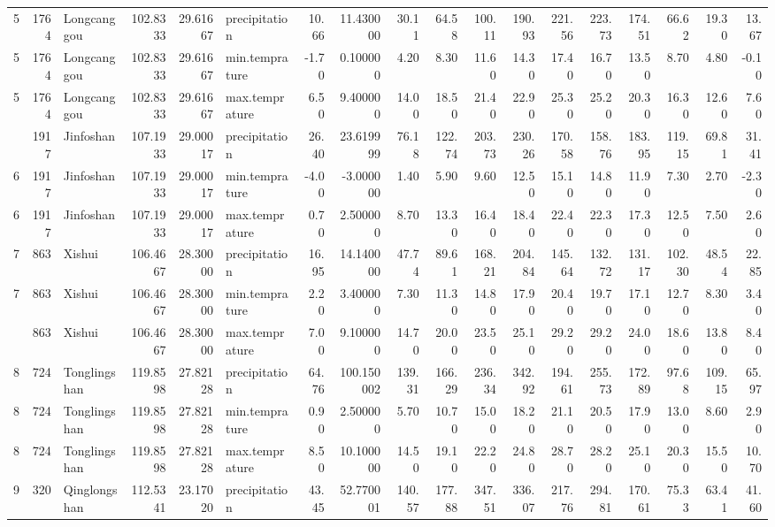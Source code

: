 \documentclass[
]{ctexart}
\begin{document}
\begin{table}
{\begin{tabular}{rrlrrlrrrrrrrrrrrr}
5 & 1764 & Longcanggou & 102.8333 & 29.61667 & precipitation & 10.66 & 11.430000 & 30.11 & 64.58 & 100.11 & 190.93 & 221.56 & 223.73 & 174.51 & 66.62 & 19.30 & 13.67\\
5 & 1764 & Longcanggou & 102.8333 & 29.61667 & min.temprature & -1.70 & 0.100000 & 4.20 & 8.30 & 11.60 & 14.30 & 17.40 & 16.70 & 13.50 & 8.70 & 4.80 & -0.10\\
5 & 1764 & Longcanggou & 102.8333 & 29.61667 & max.temprature & 6.50 & 9.400000 & 14.00 & 18.50 & 21.40 & 22.90 & 25.30 & 25.20 & 20.30 & 16.30 & 12.60 & 7.60\\
\addlinespace
6 & 1917 & Jinfoshan & 107.1933 & 29.00017 & precipitation & 26.40 & 23.619999 & 76.18 & 122.74 & 203.73 & 230.26 & 170.58 & 158.76 & 183.95 & 119.15 & 69.81 & 31.41\\
6 & 1917 & Jinfoshan & 107.1933 & 29.00017 & min.temprature & -4.00 & -3.000000 & 1.40 & 5.90 & 9.60 & 12.50 & 15.10 & 14.80 & 11.90 & 7.30 & 2.70 & -2.30\\
6 & 1917 & Jinfoshan & 107.1933 & 29.00017 & max.temprature & 0.70 & 2.500000 & 8.70 & 13.30 & 16.40 & 18.40 & 22.40 & 22.30 & 17.30 & 12.50 & 7.50 & 2.60\\
7 & 863 & Xishui & 106.4667 & 28.30000 & precipitation & 16.95 & 14.140000 & 47.74 & 89.61 & 168.21 & 204.84 & 145.64 & 132.72 & 131.17 & 102.30 & 48.54 & 22.85\\
7 & 863 & Xishui & 106.4667 & 28.30000 & min.temprature & 2.20 & 3.400000 & 7.30 & 11.30 & 14.80 & 17.90 & 20.40 & 19.70 & 17.10 & 12.70 & 8.30 & 3.40\\
\addlinespace
7 & 863 & Xishui & 106.4667 & 28.30000 & max.temprature & 7.00 & 9.100000 & 14.70 & 20.00 & 23.50 & 25.10 & 29.20 & 29.20 & 24.00 & 18.60 & 13.80 & 8.40\\
8 & 724 & Tonglingshan & 119.8598 & 27.82128 & precipitation & 64.76 & 100.150002 & 139.31 & 166.29 & 236.34 & 342.92 & 194.61 & 255.73 & 172.89 & 97.68 & 109.15 & 65.97\\
8 & 724 & Tonglingshan & 119.8598 & 27.82128 & min.temprature & 0.90 & 2.500000 & 5.70 & 10.70 & 15.00 & 18.20 & 21.10 & 20.50 & 17.90 & 13.00 & 8.60 & 2.90\\
8 & 724 & Tonglingshan & 119.8598 & 27.82128 & max.temprature & 8.50 & 10.100000 & 14.50 & 19.10 & 22.20 & 24.80 & 28.70 & 28.20 & 25.10 & 20.30 & 15.50 & 10.70\\
9 & 320 & Qinglongshan & 112.5341 & 23.17020 & precipitation & 43.45 & 52.770001 & 140.57 & 177.88 & 347.51 & 336.07 & 217.76 & 294.81 & 170.61 & 75.33 & 63.41 & 41.60\\

\end{tabular}}
\end{table}
\end{document}
